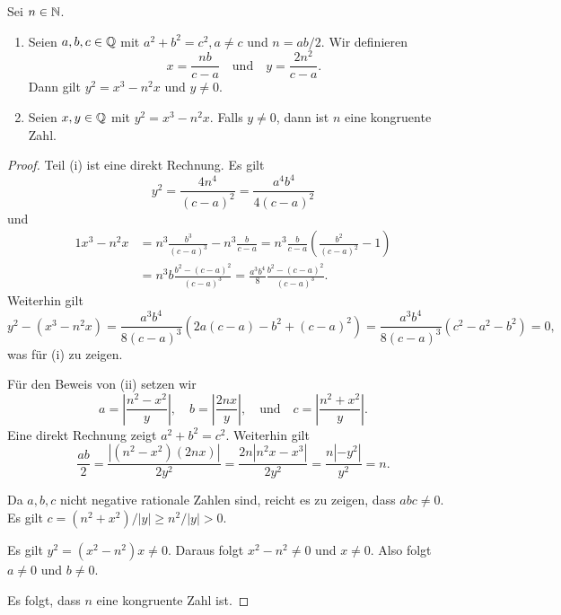 \begin{lemma} \label{lem:congruentelliptic}
  Sei $n\in{\mathbb{N}}$. 
  \begin{enumerate}
  \item
  Seien $a,b,c\in {\mathbb{Q}}$ mit $a^2+b^2=c^2,a\not=c$ und $n = ab/2$. Wir definieren
  \begin{equation*}
    x = \frac{nb}{c-a} \quad\text{und}\quad
    y = \frac{2n^2}{c-a}. 
  \end{equation*}
  Dann gilt $y^2 = x^3-n^2 x$ und $y\not=0$.
  \item Seien $x,y\in{\mathbb{Q}}$ mit $y^2 = x^3-n^2x$. Falls $y\not=0$, dann
    ist $n$ eine kongruente Zahl.
  \end{enumerate}
\end{lemma}
\begin{proof}
  Teil (i) ist eine direkt Rechnung. Es gilt
  \begin{equation*}
    y^2 = \frac{4n^4}{(c-a)^2} = \frac{a^4b^4}{4(c-a)^2} 
  \end{equation*}
  und
  \begin{alignat*}1
    x^3 -n^2 x &= n^3 \frac{b^3}{(c-a)^3} - n^3 \frac{b}{c-a}
    = n^3 \frac{b}{c-a}\left(\frac{b^2}{(c-a)^2}-1\right)\\
    &= n^3 b\frac{b^2-(c-a)^2}{(c-a)^3}
    = \frac{a^3b^4}{8}\frac{b^2-(c-a)^2}{(c-a)^3}.
  \end{alignat*}
  Weiterhin gilt  $$
  y^2 - (x^3-n^2x) = \frac{a^3b^4}{8(c-a)^3} \left(
    2a(c-a) - b^2+(c-a)^2\right) =
  \frac{a^3b^4}{8(c-a)^3} (c^2-a^2-b^2)=0,
  $$
  was für (i)  zu zeigen.

  Für den Beweis von (ii) setzen wir
  \begin{equation*}
    a = \left|\frac{n^2-x^2}{y}\right|, \quad
    b = \left|\frac{2nx}{y}\right|, \quad\text{und}\quad
    c = \left|\frac{n^2+x^2}{y}\right|. 
  \end{equation*}
  Eine direkt Rechnung zeigt $a^2+b^2=c^2$. Weiterhin gilt
  \begin{equation*}
    \frac{ab}{2} = \frac{|(n^2-x^2)(2nx)|}{2y^2} = \frac{2n |n^2x -
      x^3|}{2y^2} = \frac{n |-y^2|}{y^2} = n.
  \end{equation*}

  Da $a,b,c$ nicht negative rationale Zahlen sind, reicht es zu
  zeigen, dass $abc\not=0$. Es gilt $c = (n^2+x^2)/|y| \ge n^2/|y|>0$.

  Es gilt $y^2 = (x^2-n^2)x\not=0$. Daraus folgt 
  $x^2-n^2\not=0$ und $x\not=0$. Also folgt $a\not=0$ und $b\not=0$. 

  Es folgt, dass $n$ eine kongruente Zahl ist. 
\end{proof}

